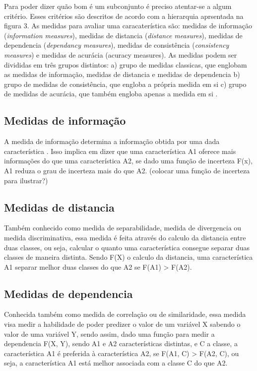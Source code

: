 Para poder dizer quão bom é um subconjunto é preciso atentar-se a algum critério. Esses critérios são descritos de acordo com a hierarquia aprsentada na figura 3. As medidas para avaliar uma caracaterística são: medidas de informação (\textit{information measures}), medidas de distancia (\textit{distance measures}), medidas de dependencia (\textit{dependancy measures}), medidas de consistência (\textit{consistency measures}) e medidas de acurácia ({acuracy measures}). \cite{liu_2005, huan_1998} As medidas podem ser divididas em três grupos distintos: a) grupo de medidas classicas, que englobam as medidas de informação, medidas de distancia e medidas de dependencia b) grupo de medidas de consistência, que engloba a própria medida em si c) grupo de medidas de acurácia, que também engloba apenas a medida em si \cite{huan_1998}.

\subsection{Medidas de informação}

A medida de informação determina a informação obtida por uma dada característica \cite{liu_2005}. Isso implica em dizer que uma característica A1 oferece mais informações do que uma característica A2, se dado uma função de incerteza F(x), A1 reduza o grau de incerteza mais do que A2.  (colocar uma função de incerteza para ilustrar?) 

\subsection{Medidas de distancia}

Também conhecido como medida de separabilidade, medida de divergencia ou medida discriminativa, essa medida é feita através do calculo da distancia entre duas classes, ou seja, calcular o quanto uma característica consegue  separar duas classes de maneira distinta. Sendo F(X) o calculo da distancia, uma característica A1 separar melhor duas classes do que A2 se F(A1) > F(A2). \cite{huan_1998}

\subsection{Medidas de dependencia}

Conhecida também como medida de correlação ou de similaridade, essa medida visa medir a habilidade de poder predizer o valor de um variável X sabendo o valor de uma variável Y, sendo assim, dado uma função para medir a dependencia F(X, Y), sendo A1 e A2 características distintas, e C a classe, a característica A1 é preferida à característica A2, se F(A1, C) > F(A2, C), ou seja, a característica A1 está melhor associada com a classe C do que A2. \cite{huan_1998, liu_2005}


